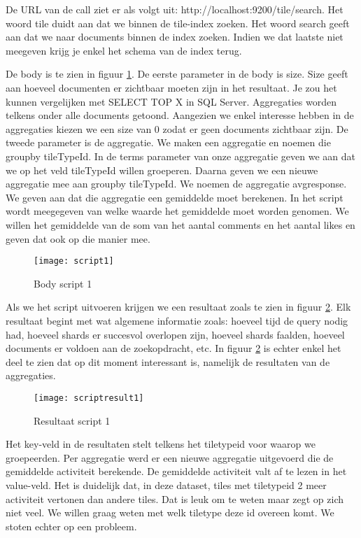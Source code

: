 De URL van de call ziet er als volgt uit: http://localhost:9200/tile/\textunderscore search. Het woord tile duidt aan dat we binnen de tile-index zoeken. Het woord \textunderscore search geeft aan dat we naar documents binnen de index zoeken. Indien we dat laatste niet meegeven krijg je enkel het schema van de index terug.

De body is te zien in figuur \ref{fig:script1}. De eerste parameter in de body is size. Size geeft aan hoeveel documenten er zichtbaar moeten zijn in het resultaat. Je zou het kunnen vergelijken met SELECT TOP X in SQL Server. Aggregaties worden telkens onder alle documents getoond. Aangezien we enkel interesse hebben in de aggregaties kiezen we een size van 0 zodat er geen documents zichtbaar zijn. De tweede parameter is de aggregatie. We maken een aggregatie en noemen die group\textunderscore by \textunderscore tileTypeId. In de terms parameter van onze aggregatie geven we aan dat we op het veld tileTypeId willen groeperen. Daarna geven we een nieuwe aggregatie mee aan group\textunderscore by \textunderscore tileTypeId. We noemen de aggregatie avg\textunderscore response. We geven aan dat die aggregatie een gemiddelde moet berekenen. In het script wordt meegegeven van welke waarde het gemiddelde moet worden genomen. We willen het gemiddelde van de som van het aantal comments en het aantal likes en geven dat ook op die manier mee.

\begin{figure}
	\centering
	\texttt{[image: script1]}
	\caption{Body script 1}
	\label{fig:script1}
\end{figure}

Als we het script uitvoeren krijgen we een resultaat zoals te zien in figuur \ref{fig:scriptresult1}. Elk resultaat begint met wat algemene informatie zoals: hoeveel tijd de query nodig had, hoeveel shards er succesvol overlopen zijn, hoeveel shards faalden, hoeveel documents er voldoen aan de zoekopdracht, etc. In figuur \ref{fig:scriptresult1} is echter enkel het deel te zien dat op dit moment interessant is, namelijk de resultaten van de aggregaties.

\begin{figure}
	\centering
	\texttt{[image: scriptresult1]}
	\caption{Resultaat script 1}
	\label{fig:scriptresult1}
\end{figure}

Het key-veld in de resultaten stelt telkens het tiletypeid voor waarop we groepeerden. Per aggregatie werd er een nieuwe aggregatie uitgevoerd die de gemiddelde activiteit berekende. De gemiddelde activiteit valt af te lezen in het value-veld. Het is duidelijk dat, in deze dataset, tiles met tiletypeid 2 meer activiteit vertonen dan andere tiles. Dat is leuk om te weten maar zegt op zich niet veel. We willen graag weten met welk tiletype deze id overeen komt. We stoten echter op een probleem.

